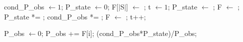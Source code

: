 \begin{algorithmic}[1]

\State cond\_P\_obs $\gets 1$;
\State P\_state $\gets 0$;
\State F[$|$S$|$] $\gets$ ; 
\State t $\gets 1$;
		\State P\_state $\gets$ ;
		\State F $\gets$ ;
	\Else
		\State P\_state *= ;
	\EndIf
	\State cond\_P\_obs *= ;
	\State F $\gets$ ;
	\State t++;
\EndWhile

\State P\_obs $\gets 0$;
	\State P\_obs += F[i];
\EndFor
\State \Return (cond\_P\_obs*P\_state)/P\_obs;

\EndFunction

\end{algorithmic}